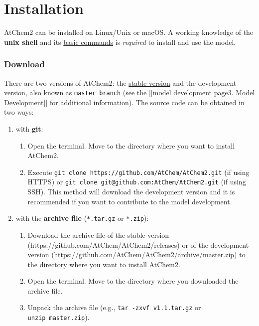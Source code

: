 \chapter{Installation} \label{ch:install}

AtChem2 can be installed on Linux/Unix or macOS. A working knowledge of
the \textbf{unix shell} and its
\href{https://swcarpentry.github.io/shell-novice/reference/}{basic
commands} is \emph{required} to install and use the model.

\subsection{Download} \label{download}

There are two versions of AtChem2: the
\href{https://github.com/AtChem/AtChem2/releases}{stable version} and
the development version, also known as \texttt{master\ branch} (see the
{[}{[}model development page\textbar{}3. Model Development{]}{]} for
additional information). The source code can be obtained in two ways:

\begin{enumerate}
\def\labelenumi{\arabic{enumi}.}
\item
  with \textbf{git}:

  \begin{enumerate}
  \def\labelenumii{\arabic{enumii}.}
    \item
    Open the terminal. Move to the directory where you want to install
    AtChem2.
  \item
    Execute \texttt{git\ clone\ https://github.com/AtChem/AtChem2.git}
    (if using HTTPS) or
    \texttt{git\ clone\ git@github.com:AtChem/AtChem2.git} (if using
    SSH). This method will download the development version and it is
    recommended if you want to contribute to the model development.
  \end{enumerate}
\item
  with the \textbf{archive file} (\texttt{*.tar.gz} or \texttt{*.zip}):

  \begin{enumerate}
  \def\labelenumii{\arabic{enumii}.}
    \item
    Download the archive file of the stable version
    (https://github.com/AtChem/AtChem2/releases) or of the development
    version (https://github.com/AtChem/AtChem2/archive/master.zip) to
    the directory where you want to install AtChem2.
  \item
    Open the terminal. Move to the directory where you downloaded the
    archive file.
  \item
    Unpack the archive file (e.g., \texttt{tar\ -zxvf\ v1.1.tar.gz} or
    \texttt{unzip\ master.zip}).
  \end{enumerate}
\end{enumerate}

